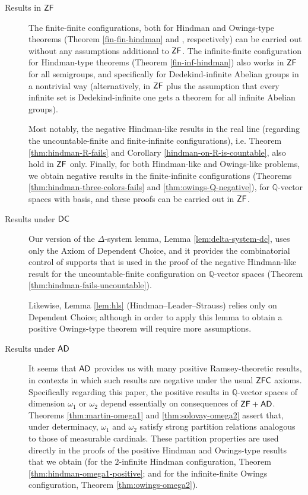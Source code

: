 \documentclass{amsart}
\theoremstyle{definition}
\newcommand{\zf}{\mathnormal{\mathsf{ZF}}}
\newcommand{\dc}{\mathnormal{\mathsf{DC}}}
\newcommand{\ad}{\mathnormal{\mathsf{AD}}}
\newcommand{\zfc}{\mathnormal{\mathsf{ZFC}}}
\theoremstyle{remark}
\numberwithin{equation}{section}
\begin{document}
\begin{description}

\item[Results in $\zf$] The finite-finite configurations, both for Hindman and Owings-type theorems (Theorem \ref{fin-fin-hindman} and \cite[Theorem 1]{FernandezSarmientoVera2024}, respectively) can be carried out without any assumptions additional to $\zf$. The infinite-finite configuration for Hindman-type theorems (Theorem \ref{fin-inf-hindman}) also works in $\zf$ for all semigroups, and specifically for Dedekind-infinite Abelian groups in a nontrivial way (alternatively, in $\zf$ plus the assumption that every infinite set is Dedekind-infinite one gets a theorem for all infinite Abelian groups).

Most notably, the negative Hindman-like results in the real line (regarding the uncountable-finite and finite-infinite configurations), i.e. Theorem \ref{thm:hindman-R-fails} and Corollary \ref{hindman-on-R-is-countable}, also hold in $\zf$ only. Finally, for both Hindman-like and Owings-like problems, we obtain negative results in the finite-infinite configurations (Theorems \ref{thm:hindman-three-colors-fails} and \ref{thm:owings-Q-negative}), for $\mathbb Q$-vector spaces with basis, and these proofs can be carried out in $\zf$.

\item[Results under $\dc$]
Our version of the $\Delta$-system lemma, Lemma \ref{lem:delta-system-dc}, uses only the Axiom of Dependent Choice, and it provides the combinatorial control of supports that is used in the proof of the negative Hindman-like result for the uncountable-finite configuration on $\mathbb Q$-vector spaces (Theorem \ref{thm:hindman-fails-uncountable}).

Likewise, Lemma \ref{lem:hls} (Hindman–Leader–Strauss) relies only on Dependent Choice; although in order to apply this lemma to obtain a positive Owings-type theorem will require more assumptions.

\item[Results under $\ad$]
It seems that $\ad$ provides us with many positive Ramsey-theoretic results, in contexts in which such results are negative under the usual $\zfc$ axioms. Specifically regarding this paper, the positive results in $\mathbb Q$-vector spaces of dimension $\omega_1$ or $\omega_2$ depend essentially on consequences of $\zf+\ad$. Theorems \ref{thm:martin-omega1} and \ref{thm:solovay-omega2} assert that, under determinacy, $\omega_1$ and $\omega_2$ satisfy strong partition relations analogous to those of measurable cardinals. These partition properties are used directly in the proofs of the positive Hindman and Owings-type results that we obtain (for the $2$-infinite Hindman configuration, Theorem \ref{thm:hindman-omega1-positive}; and for the infinite-finite Owings configuration, Theorem \ref{thm:owings-omega2}).


\end{description}
\end{document}
